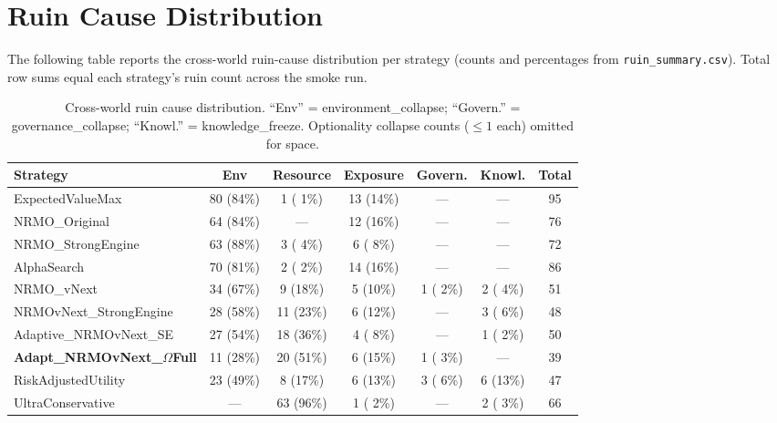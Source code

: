 \section{Ruin Cause Distribution}
\label{sec:empirical-ruin-causes}

The following table reports the cross-world ruin-cause distribution
per strategy (counts and percentages from
\texttt{ruin\_summary.csv}). Total row sums equal each strategy's
ruin count across the smoke run.

\begin{table}[ht]
\centering
\scriptsize
\renewcommand{\arraystretch}{1.05}
\begin{tabularx}{\linewidth}{Xcccccc}
\toprule
\textbf{Strategy} & \textbf{Env} & \textbf{Resource} &
\textbf{Exposure} & \textbf{Govern.} & \textbf{Knowl.} &
\textbf{Total} \\
\midrule
ExpectedValueMax     & 80 (84\%) &  1 ( 1\%) & 13 (14\%) & --- & --- &  95 \\
NRMO\_Original       & 64 (84\%) & --- & 12 (16\%) & --- & --- &  76 \\
NRMO\_StrongEngine   & 63 (88\%) &  3 ( 4\%) &  6 ( 8\%) & --- & --- &  72 \\
AlphaSearch          & 70 (81\%) &  2 ( 2\%) & 14 (16\%) & --- & --- &  86 \\
NRMO\_vNext          & 34 (67\%) &  9 (18\%) &  5 (10\%) & 1 ( 2\%) & 2 ( 4\%) &  51 \\
NRMOvNext\_StrongEngine & 28 (58\%) & 11 (23\%) &  6 (12\%) & --- & 3 ( 6\%) &  48 \\
Adaptive\_NRMOvNext\_SE & 27 (54\%) & 18 (36\%) &  4 ( 8\%) & --- & 1 ( 2\%) &  50 \\
\textbf{Adapt\_NRMOvNext\_$\Omega$Full}
                     & 11 (28\%) & 20 (51\%) &  6 (15\%) & 1 ( 3\%) & --- &  39 \\
RiskAdjustedUtility  & 23 (49\%) &  8 (17\%) &  6 (13\%) & 3 ( 6\%) & 6 (13\%) &  47 \\
UltraConservative    &  ---      & 63 (96\%) &  1 ( 2\%) & --- & 2 ( 3\%) &  66 \\
\bottomrule
\end{tabularx}
\caption[Ruin cause distribution]{Cross-world ruin cause
distribution. ``Env'' = environment\_collapse; ``Govern.'' =
governance\_collapse; ``Knowl.'' = knowledge\_freeze. Optionality
collapse counts ($\le 1$ each) omitted for space.}
\label{tab:empirical-ruin-causes}
\end{table}

